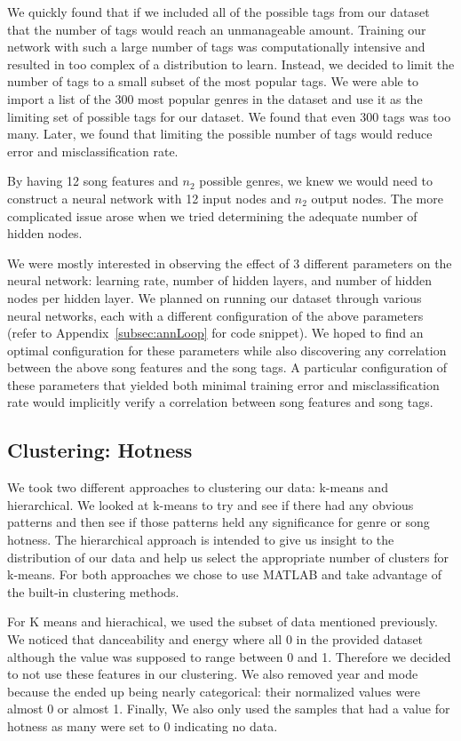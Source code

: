 \documentclass[12pt]{article}
\begin{document}
We quickly found that if we included all of the possible tags from our dataset that the number of tags would reach an unmanageable amount. Training our network with such a large number of tags was computationally intensive and resulted in too complex of a distribution to learn. Instead, we decided to limit the number of tags to a small subset of the most popular tags. We were able to import a list of the 300 most popular genres in the dataset and use it as the limiting set of possible tags for our dataset. We found that even 300 tags was too many. Later, we found that limiting the possible number of tags would reduce error and misclassification rate.

By having 12 song features and $n_2$ possible genres, we knew we would need to construct a neural network with 12 input nodes and $n_2$ output nodes. The more complicated issue arose when we tried determining the adequate number of hidden nodes.

We were mostly interested in observing the effect of 3 different parameters on the neural network: learning rate, number of hidden layers, and number of hidden nodes per hidden layer. We planned on running our dataset through various neural networks, each with a different configuration of the above parameters (refer to Appendix~\ref{subsec:annLoop} for code snippet). We hoped to find an optimal configuration for these parameters while also discovering any correlation between the above song features and the song tags. A particular configuration of these parameters that yielded both minimal training error and misclassification rate would implicitly verify a correlation between song features and song tags.

\subsection{Clustering: Hotness}
\label{subsec:clustering}
We took two different approaches to clustering our data: k-means and hierarchical. We looked at k-means to try and see if there had any obvious patterns and then see if those patterns held any significance for genre or song hotness. The hierarchical approach is intended to give us insight to the distribution of our data and help us select the appropriate number of clusters for k-means. For both approaches we chose to use MATLAB and take advantage of the built-in clustering methods.

For K means and hierachical, we used the subset of data mentioned previously. We noticed that danceability and energy where all 0 in the provided dataset although the value was supposed to range between 0 and 1. Therefore we decided to not use these features in our clustering. We also removed year and mode because the ended up being nearly categorical: their normalized values were almost 0 or almost 1. Finally, We also only used the samples that had a value for hotness as many were set to 0 indicating no data. 
\end{document}
